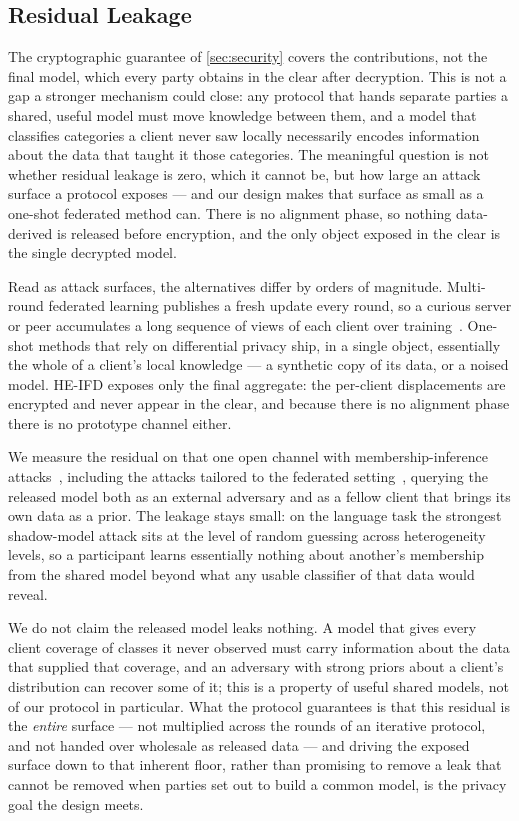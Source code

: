 \subsection{Residual Leakage}
\label{sec:mia}

The cryptographic guarantee of \cref{sec:security} covers the contributions, not the final model, which every
party obtains in the clear after decryption. This is not a gap a stronger mechanism could close: any protocol
that hands separate parties a shared, useful model must move knowledge between them, and a model that
classifies categories a client never saw locally necessarily encodes information about the data that taught
it those categories. The meaningful question is not whether residual leakage is zero, which it cannot be, but
how large an attack surface a protocol exposes --- and our design makes that surface as small as a one-shot
federated method can. There is no alignment phase, so nothing data-derived is released before encryption, and
the only object exposed in the clear is the single decrypted model.

Read as attack surfaces, the alternatives differ by orders of magnitude. Multi-round federated learning
publishes a fresh update every round, so a curious server or peer accumulates a long sequence of views of
each client over training~\cite{shokri2017membership,nasr2019comprehensive}. One-shot methods that rely on
differential privacy ship, in a single object, essentially the whole of a client's local knowledge --- a
synthetic copy of its data, or a noised model. HE-IFD exposes only the final aggregate: the per-client
displacements are encrypted and never appear in the clear, and because there is no alignment phase there is
no prototype channel either.

We measure the residual on that one open channel with membership-inference
attacks~\cite{yeom2018privacy,salem2019ml,carlini2022membership}, including the attacks tailored to the
federated setting~\cite{yang2023fdleaks,wang2024graddiff,gu2023ldia,jagielski2023students}, querying the
released model both as an external adversary and as a fellow client that brings its own data as a prior. The
leakage stays small: on the language task the strongest shadow-model attack sits at the level of random
guessing across heterogeneity levels, so a participant learns essentially nothing about another's membership
from the shared model beyond what any usable classifier of that data would reveal.

We do not claim the released model leaks nothing. A model that gives every client coverage of classes it
never observed must carry information about the data that supplied that coverage, and an adversary with
strong priors about a client's distribution can recover some of it; this is a property of useful shared
models, not of our protocol in particular. What the protocol guarantees is that this residual is the
\emph{entire} surface --- not multiplied across the rounds of an iterative protocol, and not handed over
wholesale as released data --- and driving the exposed surface down to that inherent floor, rather than
promising to remove a leak that cannot be removed when parties set out to build a common model, is the
privacy goal the design meets.
